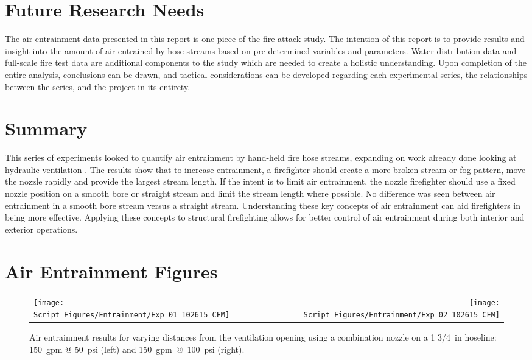 \documentclass[12pt,oneside]{book}
\begin{document}
\chapter{Future Research Needs}

The air entrainment data presented in this report is one piece of the fire attack study. The intention of this report is to provide results and insight into the amount of air entrained by hose streams based on pre-determined variables and parameters. Water distribution data and full-scale fire test data are additional components to the study which are needed to create a holistic understanding. Upon completion of the entire analysis, conclusions can be drawn, and tactical considerations can be developed regarding each experimental series, the relationships between the series, and the project in its entirety.  

\chapter{Summary}

This series of experiments looked to quantify air entrainment by hand-held fire hose streams, expanding on work already done looking at hydraulic ventilation \cite{KnappNozzles1,KnappNozzles2,KnappNozzles3,NISTHoseStreams}. The results show that to increase entrainment, a firefighter should create a more broken stream or fog pattern, move the nozzle rapidly and provide the largest stream length. If the intent is to limit air entrainment, the nozzle firefighter should use a fixed nozzle position on a smooth bore or straight stream and limit the stream length where possible.  No difference was seen between air entrainment in a smooth bore stream versus a straight stream. Understanding these key concepts of air entrainment can aid firefighters in being more effective. Applying these concepts to structural firefighting allows for better control of air entrainment during both interior and exterior operations. 



\clearpage

\appendix

\chapter{Air Entrainment Figures}
\label{app:Air_Entrainment_Figures}

\begin{figure}[!ht]
\begin{tabular*}{\textwidth}{lr}
\texttt{[image: Script\_Figures/Entrainment/Exp\_01\_102615\_CFM]} &
\texttt{[image: Script\_Figures/Entrainment/Exp\_02\_102615\_CFM]} \\
\end{tabular*}
\caption[Air Entrainment Results Varying Distances from the Ventilation Opening]{Air entrainment results for varying distances from the ventilation opening using a combination nozzle on a 1 3/4~in hoseline: 150~gpm @ 50~psi (left) and 150~gpm~@~100~psi (right).}
\label{fig:Distance_Tests}
\end{figure}
\end{document}
